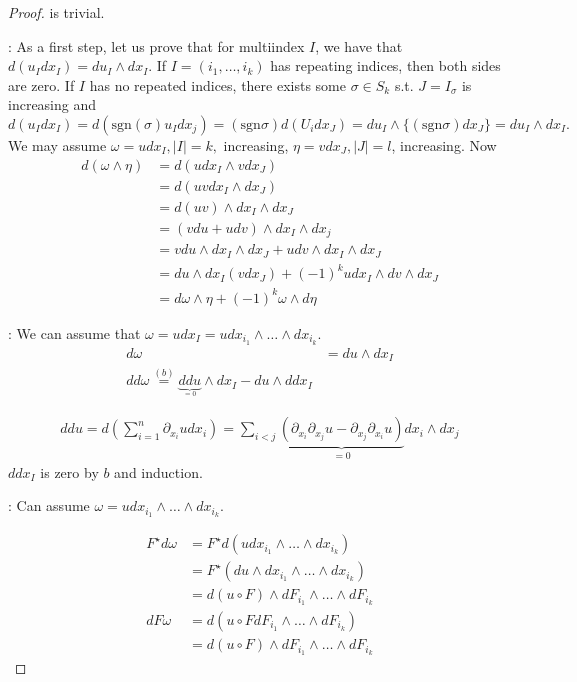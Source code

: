 \begin{proof}
     is trivial. 

    : As a first step, let us prove that for  multiindex \(I\), we have 
    that \(d(u_Idx_I)=du_I\wedge dx_I\). If \(I=(i_1,\dots,i_k)\) has repeating indices, then both sides are zero. 
    If \(I\) has no repeated indices, there exists some \(\sigma\in S_k\) s.t. \(J=I_\sigma\) is increasing and \[d(u_Idx_I)=d(\text{sgn}(\sigma)u_I dx_j)=(\text{sgn}\sigma)d(U_idx_J)=du_I\wedge \{(\text{sgn}\sigma)dx_J\}=du_I\wedge dx_I.\]
    We may assume \(\omega=udx_I,|I|=k,\) increasing, \(\eta=vdx_J,|J|=l\), increasing.
    Now \begin{align*}
        d(\omega\wedge \eta)&=d(udx_I\wedge vdx_J)\\
        &=d(uv dx_I\wedge dx_J)\\
        &=d(uv)\wedge dx_I\wedge dx_J\\
        &=(vdu+udv)\wedge dx_I \wedge dx_j\\
        &=vdu\wedge dx_I\wedge dx_J+udv\wedge dx_I\wedge dx_J\\
        &=du\wedge dx_I(vdx_J)+(-1)^k udx_I\wedge dv\wedge dx_J\\
        &=d\omega \wedge \eta + (-1)^k\omega \wedge d\eta
    \end{align*}

    : We can assume that \(\omega=udx_I=udx_{i_1}\wedge \dots \wedge dx_{i_k}\).
    \begin{align*}
        d\omega&=du\wedge dx_I\\
        dd\omega\stackrel{(b)}{=}\underbrace{ddu}_{_{=0}}\wedge dx_I-du\wedge ddx_I
    \end{align*}

    \begin{align*}
        ddu=d\left(\sum_{i=1}^n\partial_{x_i}udx_i\right)=\sum_{i<j}\underbrace{\left(\partial_{x_i}\partial_{x_j}u-\partial_{x_j}\partial_{x_i}u\right)}_{=0}dx_i\wedge dx_j
    \end{align*}
    \(ddx_I\) is zero by \(b\) and induction.

    : Can assume \(\omega=udx_{i_1}\wedge \dots \wedge dx_{i_k}\).

    \begin{align*}
        F^\star d\omega&=F^\star d(udx_{i_1}\wedge \dots \wedge dx_{i_k})\\
        &=F^\star(du\wedge dx_{i_1}\wedge \dots \wedge dx_{i_k})\\
        &=d(u\circ F)\wedge dF_{i_1}\wedge \dots \wedge dF_{i_k}\\ 
        dF\omega&=d(u\circ FdF_{i_1}\wedge \dots \wedge dF_{i_k})\\
        &=d(u\circ F)\wedge dF_{i_1}\wedge \dots \wedge dF_{i_k}
    \end{align*}
\end{proof}


